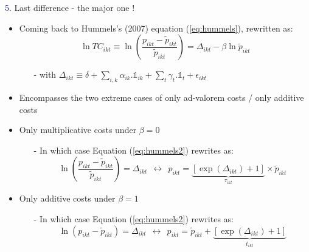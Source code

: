 \documentclass[10 pt,Helvetica, french]{beamer}
\begin{document}
\begin{frame}
\textcolor{blue}{5.} Last difference - the major one !
\begin{itemize}
\item Coming back to Hummels's (2007) equation (\ref{eq:hummels}), rewritten as:
\footnotesize
\begin{equation}
\ln TC_{ikt} \equiv \ln\left(\frac{p_{ikt}-\widetilde{p}_{ikt}}{\widetilde{p}_{ikt}}  \right) = \Delta_{ikt} - \beta \ln \widetilde{p}_{ikt} \label{eq:hummels2}
\end{equation}
\begin{itemize}
\item[-] with $\Delta_{ikt} \equiv \delta+ \sum_{i,k}\alpha_{ik}.\mathbb{1}_{ik}+ \sum_{t}\gamma_{t}.\mathbb{1}_{t} + \epsilon_{ikt}$
\end{itemize}
\normalsize
\item Encompasses the two extreme cases of only ad-valorem costs / only additive costs
\item Only multiplicative costs under $\beta=0$
\begin{itemize}
\item[-] In which case Equation (\ref{eq:hummels2}) rewrites as:
$$\ln\left(\frac{p_{ikt}-\widetilde{p}_{ikt}}{\widetilde{p}_{ikt}}  \right) = \Delta_{ikt} ~~\leftrightarrow~~ p_{ikt} = \underbrace{[\exp(\Delta_{ikt})+1]}_{\tau_{ikt}}\times \widetilde{p}_{ikt} $$
\end{itemize}
\item Only additive costs under $\beta=1$
\begin{itemize}
\item[-] In which case Equation (\ref{eq:hummels2}) rewrites as:
$$\ln\left(p_{ikt}-\widetilde{p}_{ikt}\right) = \Delta_{ikt} ~~\leftrightarrow~~ p_{ikt} = \widetilde{p}_{ikt} + \underbrace{[\exp(\Delta_{ikt})+1]}_{t_{ikt}}$$
\end{itemize}
\end{itemize}

\end{frame}
\end{document}
